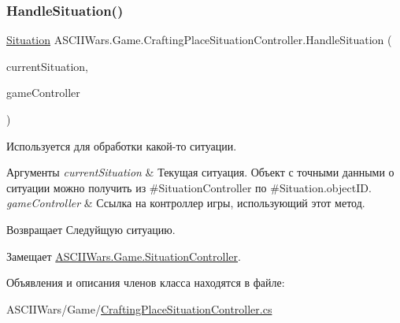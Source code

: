 \subsubsection{\texorpdfstring{Handle\+Situation()}{HandleSituation()}}
{\footnotesize\ttfamily \hyperlink{class_a_s_c_i_i_wars_1_1_game_1_1_situation}{Situation} A\+S\+C\+I\+I\+Wars.\+Game.\+Crafting\+Place\+Situation\+Controller.\+Handle\+Situation (\begin{DoxyParamCaption}\item[{\hyperlink{class_a_s_c_i_i_wars_1_1_game_1_1_situation}{Situation}}]{current\+Situation,  }\item[{\hyperlink{class_a_s_c_i_i_wars_1_1_game_1_1_game_controller}{Game\+Controller}}]{game\+Controller }\end{DoxyParamCaption})\hspace{0.3cm}{\ttfamily [inline]}}



Используется для обработки какой-\/то ситуации. 


\begin{DoxyParams}{Аргументы}
{\em current\+Situation} & Текущая ситуация. Объект с точными данными о ситуации можно получить из \#\+Situation\+Controller по \#\+Situation.\+object\+ID. \\
\hline
{\em game\+Controller} & Ссылка на контроллер игры, использующий этот метод. \\
\hline
\end{DoxyParams}
\begin{DoxyReturn}{Возвращает}
Следуйщую ситуацию. 
\end{DoxyReturn}


Замещает \hyperlink{interface_a_s_c_i_i_wars_1_1_game_1_1_situation_controller_a2cf0359dfc1683beb63f0dfed1c372e6}{A\+S\+C\+I\+I\+Wars.\+Game.\+Situation\+Controller}.



Объявления и описания членов класса находятся в файле\+:\begin{DoxyCompactItemize}
\item 
A\+S\+C\+I\+I\+Wars/\+Game/\hyperlink{_crafting_place_situation_controller_8cs}{Crafting\+Place\+Situation\+Controller.\+cs}\end{DoxyCompactItemize}
